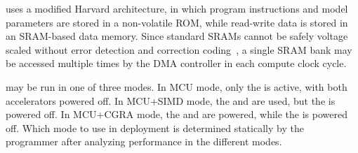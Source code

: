 \arch{}  uses a modified Harvard architecture, in which program instructions
and model parameters are stored in a non-volatile ROM, while read-write data
is stored in an SRAM-based data memory.  Since standard SRAMs cannot be safely
voltage scaled without error detection and correction coding~\cite{kumar2009sram}, a single
SRAM bank may be accessed multiple times by the DMA controller in each compute
clock cycle.

\arch{} may be run in one of three modes.  In MCU mode, only the \mcu{} is
active, with both accelerators powered off. In MCU+SIMD mode, the \mcu{} and
\vmacc{} are used, but the \cgra{} is powered off.  In MCU+CGRA mode, the
\mcu{} and \cgra{} are powered, while the \vmacc{} is powered off. Which mode
to use in deployment is determined statically by the programmer after analyzing
performance in the different modes.

